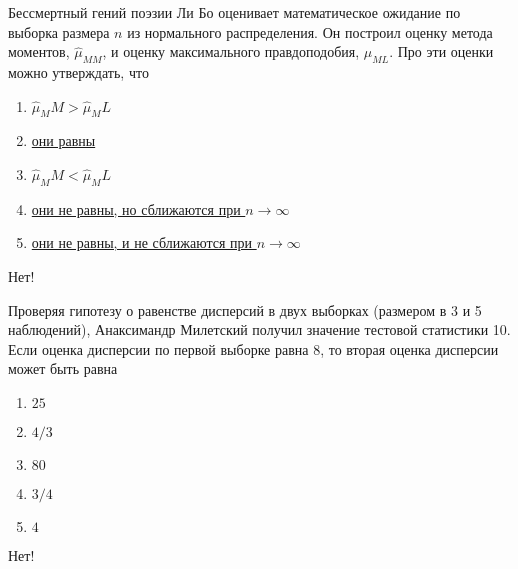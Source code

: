 \documentclass[t]{beamer}
\begin{document}
 \begin{frame} \label{53-No} 
\begin{block}{53} 

Бессмертный гений поэзии Ли Бо оценивает математическое ожидание  по выборка размера $n$ из нормального распределения. Он построил оценку метода моментов, $\hat{\mu}_{MM}$, и оценку максимального правдоподобия, $\hat{\mu}_{ML}$. Про эти оценки можно утверждать, что
 


 \end{block} 
\begin{enumerate} 
\item[] \hyperlink{53-No}{\beamergotobutton{}  $\hat\mu_MM>\hat\mu_ML$}
\item[] \hyperlink{53-Yes}{\beamergotobutton{} они равны}
\item[] \hyperlink{53-No}{\beamergotobutton{} $\hat\mu_MM<\hat\mu_ML$ }
\item[] \hyperlink{53-No}{\beamergotobutton{} они не равны, но сближаются при $n\to \infty$}
\item[] \hyperlink{53-No}{\beamergotobutton{} они не равны, и не сближаются при $n\to \infty$}
\end{enumerate} 

 \alert{Нет!} 
\end{frame} 


 \begin{frame} \label{54-No} 
\begin{block}{54} 

Проверяя гипотезу о равенстве дисперсий в двух выборках (размером в 3 и 5 наблюдений), Анаксимандр Милетский получил значение тестовой статистики 10. Если оценка дисперсии по первой выборке равна 8, то вторая оценка дисперсии может быть равна
 


 \end{block} 
\begin{enumerate} 
\item[] \hyperlink{54-No}{\beamergotobutton{} $25$}
\item[] \hyperlink{54-No}{\beamergotobutton{} $4/3$}
\item[] \hyperlink{54-Yes}{\beamergotobutton{} $80$}
\item[] \hyperlink{54-No}{\beamergotobutton{} $3/4$}
\item[] \hyperlink{54-No}{\beamergotobutton{} $4$}
\end{enumerate} 

 \alert{Нет!} 
\end{frame} 
\end{document}
